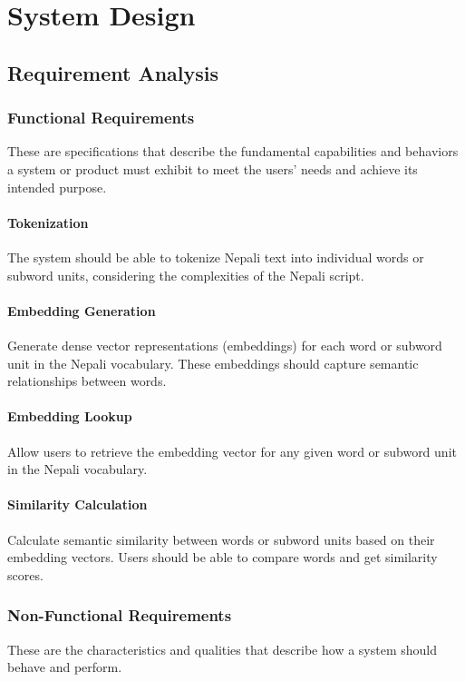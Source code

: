 \chapter{System Design}
\section{Requirement Analysis}
        \subsection{Functional Requirements}
            These are specifications that describe the fundamental capabilities and behaviors a system or product must exhibit to meet the users' needs and achieve its intended purpose. 

            \subsubsection{Tokenization}
            The system should be able to tokenize Nepali text into individual words or subword units, considering the complexities of the Nepali script.

            \subsubsection{Embedding Generation}
            Generate dense vector representations (embeddings) for each word or subword unit in the Nepali vocabulary. These embeddings should capture semantic relationships between words.

            \subsubsection{Embedding Lookup}
            Allow users to retrieve the embedding vector for any given word or subword unit in the Nepali vocabulary.

            \subsubsection{Similarity Calculation}
            Calculate semantic similarity between words or subword units based on their embedding vectors. Users should be able to compare words and get similarity scores.

        \subsection{Non-Functional Requirements}
            These are the characteristics and qualities that describe how a system should behave and perform.

